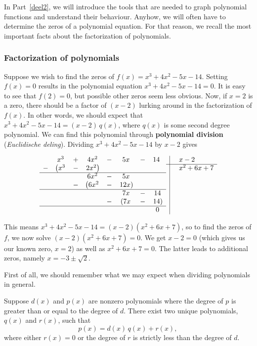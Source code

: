 \ifcourse In Part~\ref{deel2}, we will introduce the tools that are needed to graph polynomial functions and understand their behaviour. Anyhow, we will often have to determine the zeros of a polynomial equation. For that reason, we recall the most important facts about the factorization of polynomials. 
\fi

\subsubsection{Factorization of polynomials}
Suppose we wish to find the zeros of $f(x) = x^3 + 4x^2-5x-14$.  Setting $f(x)=0$ results in the polynomial equation $x^3 + 4x^2-5x-14=0$.    It is easy to see that $f(2) = 0$, but possible other zeros seem less obvious. Now, if $x=2$ is a zero, there should be a factor of $(x-2)$ lurking around in the factorization of $f(x)$.  In other words, we should expect that $x^3 + 4x^2-5x-14=(x-2) \, q(x)$, where $q(x)$ is some second degree polynomial. We can find this polynomial through \textbf{polynomial division} (\textit{Euclidische deling}). Dividing $x^3 + 4x^2-5x-14$ by $x-2$ gives

\setlength\arraycolsep{0.1pt}
\setlength\extrarowheight{2pt}


\[ \begin{array}{rccccccccl}

&x^3&+&4x^2&-&5x&-&14\, \,&\vline&\, \,x-2\\
\cline{9-10}-&\left(x^3\right.&-&\left.2x^2\right)&&&&&\vline&\, \,x^2+6x+7\\
\cline{1-8}&&&6x^2&-&5x&&&\vline&\\
&&-&\left(6x^2\right.&-&\left.12x\right)&&&\vline&\\
\cline{1-8}&&&&&7x&-&14&\vline&\\
&&&&-&\left(7x\right.&-&\left.14\right)&\vline&\\
\cline{1-8}&&&&&&&0&\vline&
\end{array}\]


\setlength\arraycolsep{5pt}
\setlength\extrarowheight{0pt}

This means $x^3 + 4x^2-5x-14=(x-2)\left(x^2+6x+7\right)$, so to find the zeros of $f$, we now solve $(x-2)\left(x^2+6x+7\right)=0$.   We get $x-2=0$ (which gives us our known zero, $x=2$) as well as $x^2+6x+7=0$.   The latter leads to additional zeros, namely $x = -3 \pm \sqrt{2}$.  

First of all, we should remember what we may expect when dividing polynomials in general.
\begin{definition} \label{polydiv}
  Suppose $d(x)$ and $p(x)$ are nonzero polynomials where the degree of $p$ is greater than or equal to the degree of $d$.  There exist two unique polynomials, $q(x)$ and $r(x)$, such that $$p(x) = d(x) \, q(x) + r(x),\,$$ where either $r(x) = 0$ or the degree of $r$ is strictly less than the degree of $d$.
\end{definition}

